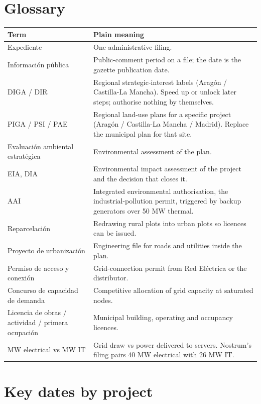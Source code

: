 \documentclass[11pt]{article}
\begin{document}
\section{Glossary}

\begin{table}[H]
\centering\small
\begin{tabular}{p{4.2cm}p{11cm}}
\toprule
Term & Plain meaning \\
\midrule
Expediente & One administrative filing. \\
Información pública & Public-comment period on a file; the date is the gazette publication date. \\
DIGA / DIR & Regional strategic-interest labels (Aragón / Castilla-La Mancha). Speed up or unlock later steps; authorise nothing by themselves. \\
PIGA / PSI / PAE & Regional land-use plans for a specific project (Aragón / Castilla-La Mancha / Madrid). Replace the municipal plan for that site. \\
Evaluación ambiental estratégica & Environmental assessment of the plan. \\
EIA, DIA & Environmental impact assessment of the project and the decision that closes it. \\
AAI & Integrated environmental authorisation, the industrial-pollution permit, triggered by backup generators over 50 MW thermal. \\
Reparcelación & Redrawing rural plots into urban plots so licences can be issued. \\
Proyecto de urbanización & Engineering file for roads and utilities inside the plan. \\
Permiso de acceso y conexión & Grid-connection permit from Red Eléctrica or the distributor. \\
Concurso de capacidad de demanda & Competitive allocation of grid capacity at saturated nodes. \\
Licencia de obras / actividad / primera ocupación & Municipal building, operating and occupancy licences. \\
MW electrical vs MW IT & Grid draw vs power delivered to servers. Nostrum's filing pairs 40 MW electrical with 26 MW IT. \\
\bottomrule
\end{tabular}
\end{table}

\section{Key dates by project}
\end{document}
